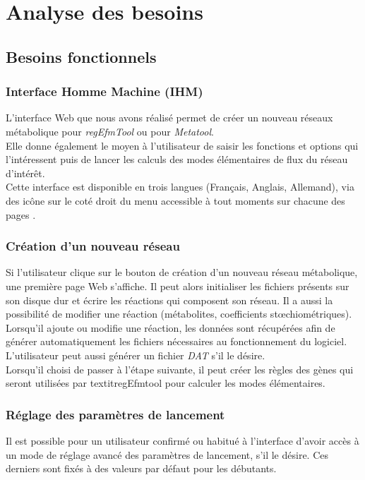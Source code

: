 \section{Analyse des besoins}

\subsection{Besoins fonctionnels}

\subsubsection{Interface Homme Machine (IHM)}
L'interface Web que nous avons réalisé permet de créer un nouveau réseaux métabolique pour \textit{regEfmTool} ou pour \emph{Metatool}.\\
Elle donne également le moyen à l'utilisateur de saisir les fonctions et options qui l'intéressent puis de lancer les calculs des modes élémentaires de flux du réseau d'intérêt.\\ 
Cette interface est disponible en trois langues (Français, Anglais, Allemand), via des icône sur le coté droit du menu accessible à tout moments sur chacune des pages .

\subsubsection{Création d'un nouveau réseau}
Si l'utilisateur clique sur le bouton de création d'un nouveau réseau métabolique, une première page Web s'affiche. Il peut alors initialiser les fichiers présents sur son disque dur et écrire les réactions qui composent son réseau. Il a aussi la possibilité de modifier une réaction (métabolites, coefficients stœchiométriques). Lorsqu'il ajoute ou modifie une réaction, les données sont récupérées afin de générer automatiquement les fichiers nécessaires au fonctionnement du logiciel.
L'utilisateur peut aussi générer un fichier \emph{DAT} s'il le désire.\\
Lorsqu'il choisi de passer à l'étape suivante, il peut créer les règles des gènes qui seront utilisées par textit{regEfmtool} pour calculer les modes élémentaires.

\subsubsection{Réglage des paramètres de lancement}
Il est possible pour un utilisateur confirmé ou habitué à l'interface d'avoir accès à un mode de réglage avancé des paramètres de lancement, s'il le désire. Ces derniers sont fixés à des valeurs par défaut pour les débutants. 

